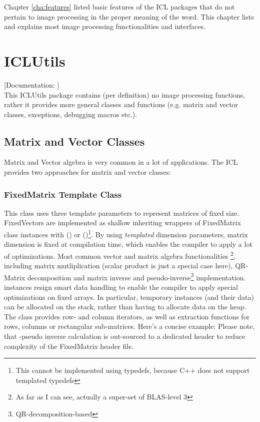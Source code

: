 Chapter \ref{cha:features} listed basic features of the ICL packages that do not pertain to image processing in the proper meaning of the word. This chapter lists and explains most image processing functionalities and interfaces.

\section{ICLUtils}

[Documentation: ]\\
This ICLUtils package contains (per definition) no image processing functions, rather it provides more general classes and functions (e.g. matrix and vector classes, exceptions, debugging macros etc.).

\subsection{Matrix and Vector Classes}
Matrix and Vector algebra is very common in a lot of applications. The ICL provides two approaches for matrix and vector classes:


\subsubsection{FixedMatrix Template Class}
This class uses three template parameters   to represent matrices of fixed size. FixedVectors are implemented as shallow inheriting wrappers of FixedMatrix class instances with  () or  ()\footnote{This cannot be implemented using typedefs, because C++ does not support templated typedefs}.
By using \emph{templated} dimension parameters, matrix dimension is fixed at compilation time, which enables the compiler to apply a lot of optimizations. Most common vector and matrix algebra functionalities \footnote{As far as I can see, actually a super-set of BLAS-level 3}, including matrix mutliplication (scalar product is just a special case here), QR-Matrix decomposition and matrix inverse and pseudo-inverse\footnote{QR-decomposition-based} implementation.  instances resign smart data handling to enable the compiler to apply special optimizations on fixed arrays. In particular, temporary instances (and their data) can be allocated on the stack, rather than having to allocate data on the heap.
The  class provides row- and column iterators, as well as extraction functions for rows, columns or rectangular sub-matrices.
Here's a concise example:
Please note, that -pseudo inverse calculation is out-sourced to a dedicated header  to reduce complexity of the FixedMatrix header file.

